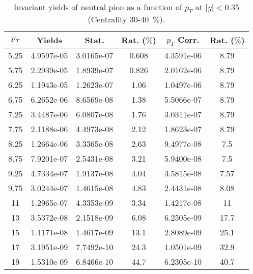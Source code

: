             
\begin{table}[!htb]
\centering
\begin{tabular}{|c|c|c|c|c|c|}
\hline
$p_{T}$ & Yields & Stat. & Rat. ($\%$) & $p_{T}$ Corr. & Rat. ($\%$) \\
\hline
5.25 & 4.9597e-05 & 3.0165e-07 & 0.608 & 4.3591e-06 & 8.79 \\ 
5.75 & 2.2939e-05 & 1.8939e-07 & 0.826 & 2.0162e-06 & 8.79 \\ 
6.25 & 1.1943e-05 & 1.2623e-07 & 1.06 & 1.0497e-06 & 8.79 \\ 
6.75 & 6.2652e-06 & 8.6569e-08 & 1.38 & 5.5066e-07 & 8.79 \\ 
7.25 & 3.4487e-06 & 6.0807e-08 & 1.76 & 3.0311e-07 & 8.79 \\ 
7.75 & 2.1188e-06 & 4.4973e-08 & 2.12 & 1.8623e-07 & 8.79 \\ 
8.25 & 1.2664e-06 & 3.3365e-08 & 2.63 & 9.4977e-08 & 7.5 \\ 
8.75 & 7.9201e-07 & 2.5431e-08 & 3.21 & 5.9400e-08 & 7.5 \\ 
9.25 & 4.7334e-07 & 1.9137e-08 & 4.04 & 3.5815e-08 & 7.57 \\ 
9.75 & 3.0244e-07 & 1.4615e-08 & 4.83 & 2.4431e-08 & 8.08 \\ 
11 & 1.2965e-07 & 4.3353e-09 & 3.34 & 1.4217e-08 & 11 \\ 
13 & 3.5372e-08 & 2.1518e-09 & 6.08 & 6.2505e-09 & 17.7 \\ 
15 & 1.1171e-08 & 1.4617e-09 & 13.1 & 2.8089e-09 & 25.1 \\ 
17 & 3.1951e-09 & 7.7492e-10 & 24.3 & 1.0501e-09 & 32.9 \\ 
19 & 1.5310e-09 & 6.8466e-10 & 44.7 & 6.2305e-10 & 40.7 \\ 
\hline
\end{tabular}
\caption{Invariant yields of neutral pion as a function of $p_{T}$ at $|y|<0.35$ (Centrality 30-40~$\%$).}
\end{table}
            
